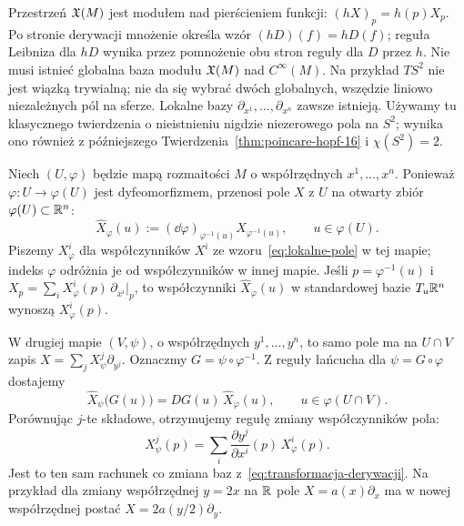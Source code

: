 \begin{uwaga}
Przestrzeń $\mathfrak X(M)$ jest modułem nad pierścieniem funkcji:
$(hX)_p=h(p)X_p$. Po stronie derywacji mnożenie określa wzór
$(hD)(f)=hD(f)$; reguła Leibniza dla $hD$ wynika przez pomnożenie
obu stron reguły dla $D$ przez $h$.
Nie musi istnieć globalna baza modułu $\mathfrak X(M)$ nad $C^\infty(M)$.
Na przykład $TS^2$ nie jest wiązką trywialną; nie da się wybrać
dwóch globalnych, wszędzie liniowo niezależnych pól na sferze.
Lokalne bazy $\partial_{x^1},\ldots,\partial_{x^n}$ zawsze istnieją.
Używamy tu klasycznego twierdzenia o nieistnieniu nigdzie
niezerowego pola na $S^2$; wynika ono również z późniejszego
Twierdzenia~\ref{thm:poincare-hopf-16} i $\chi(S^2)=2$.
\end{uwaga}

\begin{uwaga}
Niech $(U,\varphi)$ będzie mapą rozmaitości $M$
o współrzędnych $x^1,\ldots,x^n$.
Ponieważ $\varphi\colon U\to\varphi(U)$ jest dyfeomorfizmem,
przenosi pole $X$ z $U$ na otwarty zbiór $\varphi(U)\subset\mathbb{R}^n$:
\begin{equation}\label{eq:pole-przeniesione-mapa}
\widehat X_\varphi(u)
:=(\dd\varphi)_{\varphi^{-1}(u)}X_{\varphi^{-1}(u)},
\qquad u\in\varphi(U).
\end{equation}
Piszemy $X_\varphi^i$ dla współczynników $X^i$
ze wzoru~\eqref{eq:lokalne-pole} w tej mapie;
indeks $\varphi$ odróżnia je od współczynników w innej mapie.
Jeśli $p=\varphi^{-1}(u)$ i
$X_p=\sum_iX_\varphi^i(p)\,\partial_{x^i}|_p$,
to współczynniki $\widehat X_\varphi(u)$ w standardowej bazie
$T_u\mathbb{R}^n$ wynoszą $X_\varphi^i(p)$.

W drugiej mapie $(V,\psi)$, o współrzędnych $y^1,\ldots,y^n$,
to samo pole ma na $U\cap V$ zapis
$X=\sum_jX_\psi^j\partial_{y^j}$.
Oznaczmy $G=\psi\circ\varphi^{-1}$.
Z reguły łańcucha dla $\psi=G\circ\varphi$ dostajemy
\[
\widehat X_\psi\bigl(G(u)\bigr)
=DG(u)\,\widehat X_\varphi(u),
\qquad u\in\varphi(U\cap V).
\]
Porównując $j$-te składowe, otrzymujemy regułę zmiany
współczynników pola:
\begin{equation}\label{eq:transformacja-wspolczynnikow-pola}
X_\psi^j(p)=\sum_i\frac{\partial y^j}{\partial x^i}(p)\,X_\varphi^i(p).
\end{equation}
Jest to ten sam rachunek co zmiana baz
z~\eqref{eq:transformacja-derywacji}.
Na przykład dla zmiany współrzędnej $y=2x$ na $\mathbb{R}$ pole
$X=a(x)\partial_x$ ma w nowej współrzędnej postać
$X=2a(y/2)\partial_y$.
\end{uwaga}

